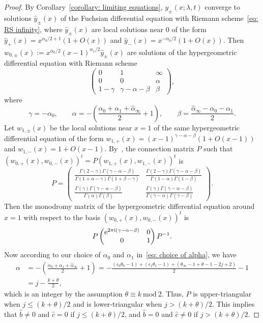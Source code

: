\documentclass[pdftex]{sigma}
\numberwithin{equation}{section}
\def\mod{\ \mathrm{mod}\ }
\def\M#1#2#3#4{\begin{pmatrix}#1&#2\\#3&#4\end{pmatrix}}
\begin{document}
\begin{proof} By Corollary~\ref{corollary: limiting equations},
 $y_\pm(x;\lambda,t)$ converge to solutions $\hat y_\pm(x)$ of the
 Fuchsian differential equation with Riemann scheme~\eqref{eq: RS
 infinity}, where $\hat y_\pm(x)$ are local solutions near $0$ of
 the form $\hat y_+(x)=x^{\alpha_0/2+1}(1+O(x))$ and $\hat
 y_-(x)=x^{-\alpha_0/2}(1+O(x))$. Then
 $w_{0,\pm}(x):=x^{\alpha_0/2}(x-1)^{\alpha_1/2}\hat
 y_\pm(x)$ are solutions of the hypergeometric differential equation
 with Riemann scheme
\[
 \begin{pmatrix} 0 & 1 & \infty \\
 0 & 0 & \alpha \\
 1-\gamma & \gamma-\alpha-\beta & \beta\end{pmatrix},
\]
 where
\[
 \gamma=-\alpha_0, \qquad
 \alpha=-\left(\frac{\alpha_0+\alpha_1+\hat\alpha_\infty}2+1\right),
 \qquad
 \beta=\frac{\hat\alpha_\infty-\alpha_0-\alpha_1}2.
\]
 Let $w_{1,\pm}(x)$ be the local solutions near $x=1$ of the same
 hypergeometric differential equation of the form
 $w_{1,+}(x)=(x-1)^{\gamma-\alpha-\beta}(1+O(x-1))$ and
 $w_{1,-}(x)=1+O(x-1)$. By~\cite[Chapter~2, Theorem~4.7.1]{Yoshida}, the connection matrix $P$ such that
 $(w_{0,+}(x),w_{0,-}(x))^t=P{(w_{1,+}(x),w_{1,-}(x))^t}$ is
\[
 P=\begin{pmatrix}
 \displaystyle
 \frac{\Gamma(2-\gamma)\Gamma(\gamma-\alpha-\beta)}
 {\Gamma(1+\alpha-\gamma)\Gamma(1+\beta-\gamma)} &
 \displaystyle
 \frac{\Gamma(2-\gamma)\Gamma(\gamma-\alpha-\beta)}
 {\Gamma(1-\alpha)\Gamma(1-\beta)} \\[10pt]
 \displaystyle
 \frac{\Gamma(\gamma)\Gamma(\gamma-\alpha-\beta)}
 {\Gamma(\alpha)\Gamma(\beta)} &
 \displaystyle\frac{\Gamma(\gamma)\Gamma(\gamma-\alpha-\beta)}
 {\Gamma(\gamma-\alpha)\Gamma(\gamma-\beta)} \end{pmatrix}.
\]
 Then the monodromy matrix of the hypergeometric differential
 equation around $x=1$ with respect to the basis
 $(w_{0,+}(x),w_{0,-}(x))^t$ is
\[
 P\M{{\rm e}^{2\pi {\rm i}(\gamma-\alpha-\beta)}}001P^{-1}.
\]
 Now according to our choice of $\alpha_0$ and $\alpha_1$ in~\eqref{eq: choice of alpha}, we have
 \begin{align*}
 \alpha&{}=-\left(\frac{\alpha_0+\alpha_1+\hat\alpha_\infty}2
 +1\right)
=-\frac{(\epsilon_0\theta_0-1)+(\epsilon_1\theta_1-1)
 +(\theta_\infty-1+\theta-1-2j+2)}2-1 \\
 &{}=j-\frac{k+\theta}2,
 \end{align*}
 which is an integer by the assumption $\theta\equiv k\mod 2$.
 Thus, $P$ is upper-triangular when $j\le(k+\theta)/2$ and is
 lower-triangular when $j>(k+\theta)/2$. This implies that $\hat
 b\neq0$ and $\hat c=0$ if $j\le(k+\theta)/2$, and $\hat b=0$ and
 $\hat c\neq 0$ if $j>(k+\theta)/2$.
\end{proof}
\end{document}
